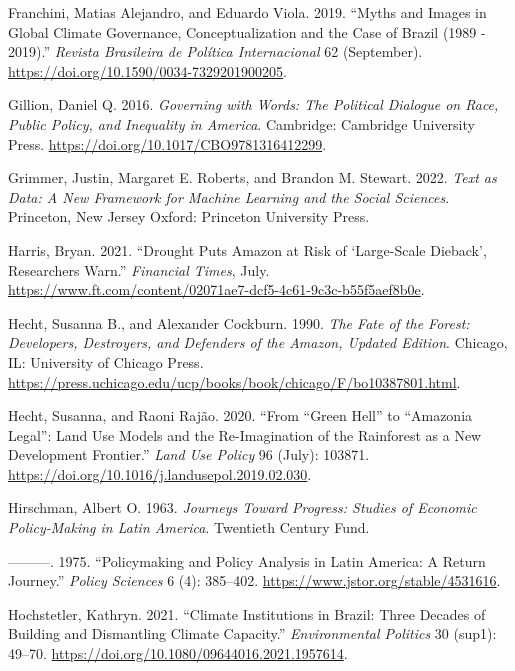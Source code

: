 \documentclass[
  12pt,
]{article}
\newlength{\cslhangindent}
\newlength{\cslentryspacingunit} %
\newenvironment{CSLReferences}[2] %
 {%
  \setlength{\parindent}{0pt}
  \ifodd #1
  \let\oldpar\par
  \def\par{\hangindent=\cslhangindent\oldpar}
  \fi
  \setlength{\parskip}{#2\cslentryspacingunit}
 }%
 {}
\begin{document}
\begin{CSLReferences}{1}{0}
\leavevmode{}%
Franchini, Matias Alejandro, and Eduardo Viola. 2019. {``Myths and
Images in Global Climate Governance, Conceptualization and the Case of
Brazil (1989 - 2019).''} \emph{Revista Brasileira de Política
Internacional} 62 (September).
\url{https://doi.org/10.1590/0034-7329201900205}.

\leavevmode{}%
Gillion, Daniel Q. 2016. \emph{Governing with Words: The Political
Dialogue on Race, Public Policy, and Inequality in America}. Cambridge:
Cambridge University Press.
\url{https://doi.org/10.1017/CBO9781316412299}.

\leavevmode{}%
Grimmer, Justin, Margaret E. Roberts, and Brandon M. Stewart. 2022.
\emph{Text as Data: A New Framework for Machine Learning and the Social
Sciences}. Princeton, New Jersey Oxford: Princeton University Press.

\leavevmode{}%
Harris, Bryan. 2021. {``Drought Puts Amazon at Risk of {`}Large-Scale
Dieback{'}, Researchers Warn.''} \emph{Financial Times}, July.
\url{https://www.ft.com/content/02071ae7-dcf5-4c61-9c3c-b55f5aef8b0e}.

\leavevmode{}%
Hecht, Susanna B., and Alexander Cockburn. 1990. \emph{The Fate of the
Forest: Developers, Destroyers, and Defenders of the Amazon, Updated
Edition}. Chicago, IL: University of Chicago Press.
\url{https://press.uchicago.edu/ucp/books/book/chicago/F/bo10387801.html}.

\leavevmode{}%
Hecht, Susanna, and Raoni Rajão. 2020. {``From {``}Green Hell{''} to
{``}Amazonia Legal{''}: Land Use Models and the Re-Imagination of the
Rainforest as a New Development Frontier.''} \emph{Land Use Policy} 96
(July): 103871. \url{https://doi.org/10.1016/j.landusepol.2019.02.030}.

\leavevmode{}%
Hirschman, Albert O. 1963. \emph{Journeys Toward Progress: Studies of
Economic Policy-Making in Latin America}. Twentieth Century Fund.

\leavevmode{}%
---------. 1975. {``Policymaking and Policy Analysis in Latin America: A
Return Journey.''} \emph{Policy Sciences} 6 (4): 385--402.
\url{https://www.jstor.org/stable/4531616}.

\leavevmode{}%
Hochstetler, Kathryn. 2021. {``Climate Institutions in Brazil: Three
Decades of Building and Dismantling Climate Capacity.''}
\emph{Environmental Politics} 30 (sup1): 49--70.
\url{https://doi.org/10.1080/09644016.2021.1957614}.


\end{CSLReferences}
\end{document}
